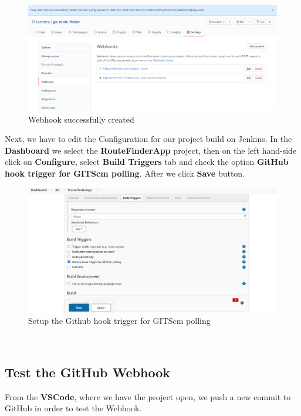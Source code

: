 \documentclass[12pt,a4paper,twoside]{article}
\begin{document}
\begin{figure}[H]
    \centering
        \includegraphics[width=15cm]{images-aws/45-web-hook-created.png}
        \caption{Webhook successfully created}
\end{figure}


Next, we have to edit the Configuration for our project build on Jenkins. In the \textbf{Dashboard} we select the \textbf{RouteFinderApp} project, then on the left hand-side click on \textbf{Configure}, select \textbf{Build Triggers} tab and check the option \textbf{GitHub hook trigger for GITScm polling}. After we click \textbf{Save} button.


\begin{figure}[H]
    \centering
        \includegraphics[width=15cm]{images-aws/46-trigger-jenkins.png}
        \caption{Setup the Github hook trigger for GITScm polling}
\end{figure}




~\newpage


\subsection{Test the GitHub Webhook}


From the \textbf{VSCode}, where we have the project open, we push a new commit to GitHub in order to test the Webhook.
\end{document}
